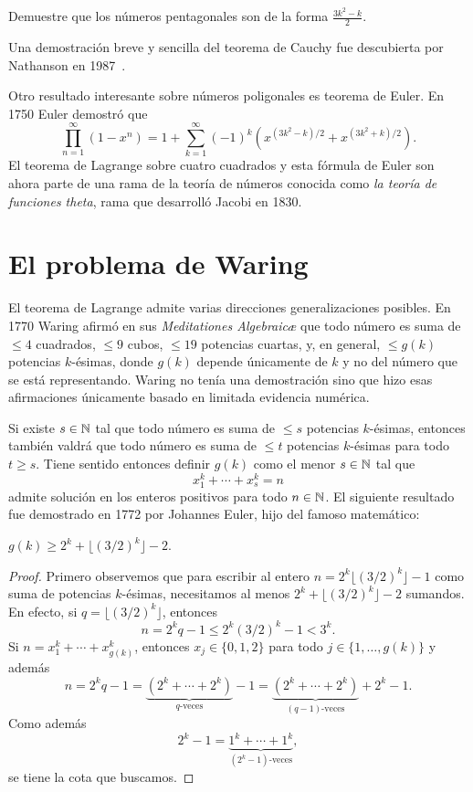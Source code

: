 \begin{exercise}
	Demuestre que los números pentagonales son de la forma
	$\displaystyle{\frac{3k^2-k}{2}}$. 
\end{exercise}

Una demostración
breve y sencilla del teorema de Cauchy fue descubierta por Nathanson en
1987~\cite{MR866422}.

Otro resultado interesante sobre números poligonales es teorema de Euler. 
En 1750 Euler demostró que
\[
	\prod_{n=1}^\infty(1-x^n)=1+\sum_{k=1}^\infty (-1)^k\left(x^{(3k^2-k)/2}+x^{(3k^2+k)/2}\right).
\]
El teorema de Lagrange sobre cuatro cuadrados y esta fórmula de Euler son ahora
parte de una rama de la teoría de números conocida como
\emph{la teoría de funciones theta}, rama que desarrolló Jacobi en 1830. 

\section*{El problema de Waring}

El teorema de Lagrange admite varias direcciones generalizaciones posibles. En
1770 Waring afirmó en sus \emph{Meditationes Algebraic\ae} que todo número es
suma de $\leq 4$ cuadrados, $\leq 9$ cubos, $\leq 19$ potencias cuartas, y, en
general, $\leq g(k)$ potencias $k$-ésimas, donde $g(k)$ depende únicamente de
$k$ y no del número que se está representando. Waring no tenía una demostración
sino que hizo esas afirmaciones únicamente basado en limitada evidencia
numérica. 

Si existe $s\in\mathbb{N}$ tal que todo número es suma de $\leq s$ potencias
$k$-ésimas, entonces también valdrá que todo número es suma de $\leq t$
potencias $k$-ésimas para todo $t\geq s$. Tiene sentido entonces definir $g(k)$
como el menor $s\in\mathbb{N}$ tal que 
\[
	x_1^k+\cdots+x_s^k=n
\]
admite solución en los enteros positivos para todo $n\in\mathbb{N}$. El siguiente
resultado fue demostrado en 1772 por Johannes Euler, hijo del famoso
matemático: 

\begin{theorem}[Euler]
	$g(k)\geq 2^k+\lfloor (3/2)^k\rfloor-2$. 
\end{theorem}

\begin{proof}
	Primero observemos que para escribir al entero $n=2^k\lfloor
	(3/2)^k\rfloor-1$ como suma de potencias $k$-ésimas, necesitamos al menos
	$2^k+\lfloor (3/2)^k\rfloor-2$ sumandos. En efecto, si $q=\lfloor
	(3/2)^k\rfloor$, entonces
	\[
		n=2^kq-1\leq 2^k(3/2)^k-1<3^k.
	\]
	Si $n=x_1^k+\cdots+x_{g(k)}^k$, entonces $x_j\in\{0,1,2\}$ para todo
	$j\in\{1,\dots,g(k)\}$ y además 
	\[
		n=2^kq-1=\underbrace{(2^k+\cdots+2^k)}_{q\text{-veces}}-1=\underbrace{(2^k+\cdots+2^k)}_{(q-1)\text{-veces}}+2^k-1.
	\]
	Como además 
	\[
		2^k-1=\underbrace{1^k+\cdots+1^k}_{(2^k-1)\text{-veces}},
	\]
	se tiene la cota que buscamos.
\end{proof}

